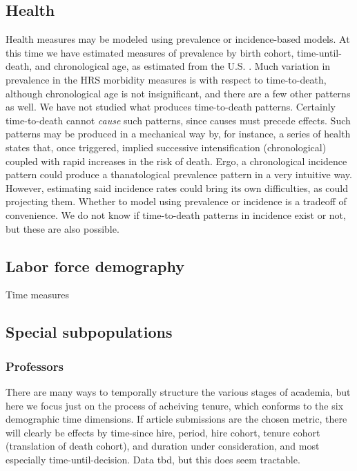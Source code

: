 \documentclass[11pt,oneside]{article} %
\begin{document}
		\FloatBarrier
	\subsection{Health}
		
		Health measures may be modeled using prevalence or incidence-based models. At
		this time we have estimated measures of prevalence by birth cohort,
		time-until-death, and chronological age, as estimated from the U.S.
		\citet{HRS} \citep{riffe2015ttd}. Much variation in prevalence in the HRS
		morbidity measures is with respect to time-to-death, although
		chronological age is not insignificant, and there are a few other patterns as
		well. We have not studied what produces time-to-death patterns. Certainly
		time-to-death cannot \textit{cause} such patterns, since causes must precede
		effects. Such patterns may be produced in a mechanical way by, for instance, a
		series of health states that, once triggered, implied successive
		intensification (chronological) coupled with rapid
		increases in the risk of death. Ergo, a chronological incidence pattern could
		produce a thanatological prevalence pattern in a very intuitive way. However,
		estimating said incidence rates could bring its own difficulties, as could
		projecting them. Whether to model using prevalence or
		incidence is a tradeoff of convenience. We do not know if time-to-death patterns in incidence exist
		or not, but these are also possible.
	
	\subsection{Labor force demography}
	Time measures
	\subsection{Special subpopulations}
		\subsubsection{Professors}
		There are many ways to temporally structure the various stages of academia,
		but here we focus just on the process of acheiving tenure, which conforms to
		the six demographic time dimensions. If article submissions are the chosen
		metric, there will clearly be effects by time-since hire, period, hire cohort,
		tenure cohort (translation of death cohort), and duration under consideration, 
		and most especially time-until-decision. Data tbd, but this does seem
		tractable.
		
\end{document}
